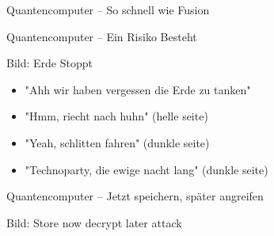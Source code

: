 \begin{frame}[T]{Quantencomputer – So schnell wie Fusion}
  
%

\end{frame}


\begin{frame}[T]{Quantencomputer – Ein Risiko Besteht}

Bild: Erde Stoppt
\begin{itemize}
  \item "Ahh wir haben vergessen die Erde zu tanken"
  \item "Hmm, riecht nach huhn" (helle seite)
  \item "Yeah, schlitten fahren" (dunkle seite)
  \item "Technoparty, die ewige nacht lang" (dunkle seite)
\end{itemize}

\end{frame}


\begin{frame}[T]{Quantencomputer – Jetzt speichern, später angreifen}

Bild: Store now decrypt later attack

\end{frame}
